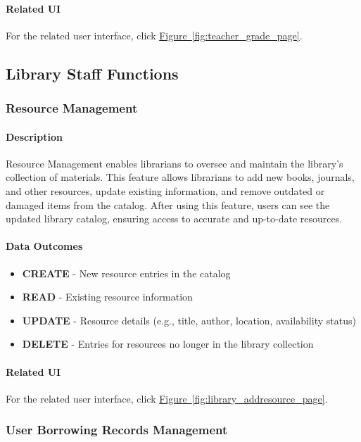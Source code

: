\documentclass[12pt]{article}
\begin{document}
\paragraph{Related UI}
For the related user interface, click \hyperref[fig:teacher_grade_page]{Figure~\ref*{fig:teacher_grade_page}}.

\subsection{Library Staff Functions}
\subsubsection{Resource Management}

\paragraph{Description}
Resource Management enables librarians to oversee and maintain the library's collection of materials. This feature allows librarians to add new books, journals, and other resources, update existing information, and remove outdated or damaged items from the catalog. After using this feature, users can see the updated library catalog, ensuring access to accurate and up-to-date resources.

\paragraph{Data Outcomes}
\begin{itemize}
    \item \textbf{CREATE} - New resource entries in the catalog
    \item \textbf{READ} - Existing resource information
    \item \textbf{UPDATE} - Resource details (e.g., title, author, location, availability status)
    \item \textbf{DELETE} - Entries for resources no longer in the library collection
\end{itemize}

\paragraph{Related UI}
For the related user interface, click \hyperref[fig:library_addresource_page]{Figure~\ref*{fig:library_addresource_page}}.

\subsubsection{User Borrowing Records Management}
\end{document}
